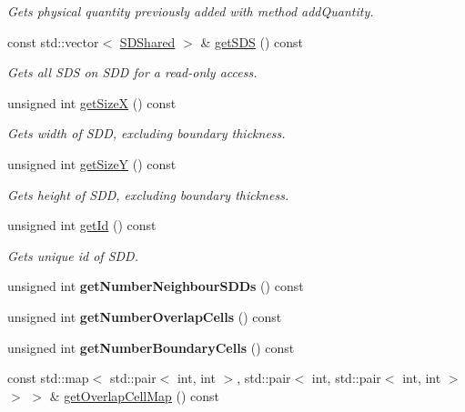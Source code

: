 \begin{DoxyCompactItemize}
\begin{DoxyCompactList}\small\item\em Gets physical quantity previously added with method add\+Quantity. \end{DoxyCompactList}\item 
const std\+::vector$<$ \mbox{\hyperlink{classSDShared}{S\+D\+Shared}} $>$ \& \mbox{\hyperlink{classSDDistributed_a9afba0607b6012a0e446b95251559f5d}{get\+S\+DS}} () const
\begin{DoxyCompactList}\small\item\em Gets all S\+DS on S\+DD for a read-\/only access. \end{DoxyCompactList}\item 
unsigned int \mbox{\hyperlink{classSDDistributed_a567b9535558271515166ce7ebd3f6c29}{get\+SizeX}} () const
\begin{DoxyCompactList}\small\item\em Gets width of S\+DD, excluding boundary thickness. \end{DoxyCompactList}\item 
unsigned int \mbox{\hyperlink{classSDDistributed_a9bf0049f4c95513b4d9c9a9bac0f6eb4}{get\+SizeY}} () const
\begin{DoxyCompactList}\small\item\em Gets height of S\+DD, excluding boundary thickness. \end{DoxyCompactList}\item 
unsigned int \mbox{\hyperlink{classSDDistributed_a0ab71d942dca319b739390055942a96a}{get\+Id}} () const
\begin{DoxyCompactList}\small\item\em Gets unique id of S\+DD. \end{DoxyCompactList}\item 
\mbox{\label{classSDDistributed_a8a7bf55ebead74e2c234fe21ebc02475}} 
unsigned int {\bfseries get\+Number\+Neighbour\+S\+D\+Ds} () const
\item 
\mbox{\label{classSDDistributed_a9fe968b07308e670e2bc53597d2d139f}} 
unsigned int {\bfseries get\+Number\+Overlap\+Cells} () const
\item 
\mbox{\label{classSDDistributed_ad8247f4958820ef02d97e22059ee7f94}} 
unsigned int {\bfseries get\+Number\+Boundary\+Cells} () const
\item 
const std\+::map$<$ std\+::pair$<$ int, int $>$, std\+::pair$<$ int, std\+::pair$<$ int, int $>$ $>$ $>$ \& \mbox{\hyperlink{classSDDistributed_a2a2e744edad326561e3555a352ce4a0a}{get\+Overlap\+Cell\+Map}} () const

\end{DoxyCompactItemize}
